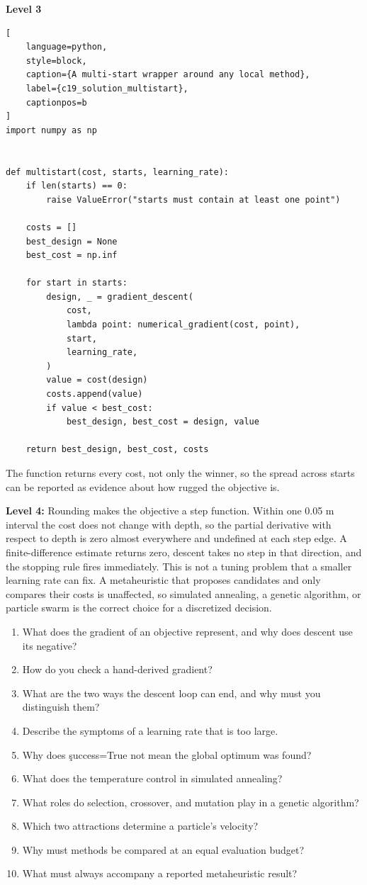 \textbf{Level 3}

\begin{lstlisting}[
    language=python,
    style=block,
    caption={A multi-start wrapper around any local method},
    label={c19_solution_multistart},
    captionpos=b
]
import numpy as np


def multistart(cost, starts, learning_rate):
    if len(starts) == 0:
        raise ValueError("starts must contain at least one point")

    costs = []
    best_design = None
    best_cost = np.inf

    for start in starts:
        design, _ = gradient_descent(
            cost,
            lambda point: numerical_gradient(cost, point),
            start,
            learning_rate,
        )
        value = cost(design)
        costs.append(value)
        if value < best_cost:
            best_design, best_cost = design, value

    return best_design, best_cost, costs
\end{lstlisting}

The function returns every cost, not only the winner, so the spread across
starts can be reported as evidence about how rugged the objective is.

\textbf{Level 4:} Rounding makes the objective a step function. Within one
0.05 m interval the cost does not change with depth, so the partial derivative
with respect to depth is zero almost everywhere and undefined at each step edge.
A finite-difference estimate returns zero, descent takes no step in that
direction, and the stopping rule fires immediately. This is not a tuning problem
that a smaller learning rate can fix. A metaheuristic that proposes candidates
and only compares their costs is unaffected, so simulated annealing, a genetic
algorithm, or particle swarm is the correct choice for a discretized decision.


\begin{enumerate}
    \item What does the gradient of an objective represent, and why does descent
          use its negative?
    \item How do you check a hand-derived gradient?
    \item What are the two ways the descent loop can end, and why must you
          distinguish them?
    \item Describe the symptoms of a learning rate that is too large.
    \item Why does \c{success=True} not mean the global optimum was found?
    \item What does the temperature control in simulated annealing?
    \item What roles do selection, crossover, and mutation play in a genetic
          algorithm?
    \item Which two attractions determine a particle's velocity?
    \item Why must methods be compared at an equal evaluation budget?
    \item What must always accompany a reported metaheuristic result?
\end{enumerate}

